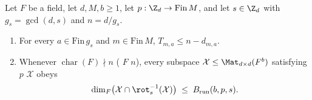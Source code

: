 \begin{theorem}\label{thm:1a-single-shift}
Let $F$ be a field, let $d, M, b \ge 1$, let $p : \Z_d \to \mathrm{Fin}\,M$, and let
$s \in \Z_d$ with $g_s = \gcd(d, s)$ and $n = d / g_s$.
\begin{enumerate}[label=(\alph*)]
\item For every $a \in \mathrm{Fin}\,g_s$ and $m \in \mathrm{Fin}\,M$, $T_{m,a} \le n - d_{m,a}$.
\item Whenever $\operatorname{char}(F) \nmid n$ ( $F$ $n$), every subspace
  $\mathcal{X} \le \Mat_{d\times d}(F^b)$ satisfying  $p$
  $\mathcal{X}$ obeys
  \[
    \dim_F\bigl(\mathcal{X} \cap \rot_s^{-1}(\mathcal{X})\bigr)
    \;\le\;
    B_{\mathrm{run}}(b, p, s).
  \]
\end{enumerate}
\end{theorem}
